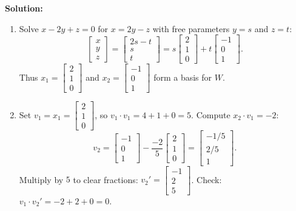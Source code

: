 \documentclass[11pt, letterpaper]{article}
\theoremstyle{definition}
\theoremstyle{remark}
\begin{document}
\textbf{Solution:}
\begin{enumerate}[label=\textbf{Step \arabic*:}]
    \item Solve $x - 2y + z = 0$ for $x = 2y - z$ with free parameters $y = s$ and $z = t$:
    \[
        \begin{bmatrix} x \\ y \\ z \end{bmatrix} = \begin{bmatrix} 2s - t \\ s \\ t \end{bmatrix} = s\begin{bmatrix} 2 \\ 1 \\ 0 \end{bmatrix} + t\begin{bmatrix} -1 \\ 0 \\ 1 \end{bmatrix}.
    \]
    Thus $x_1 = \begin{bmatrix} 2 \\ 1 \\ 0 \end{bmatrix}$ and $x_2 = \begin{bmatrix} -1 \\ 0 \\ 1 \end{bmatrix}$ form a basis for $W$.
    \item Set $v_1 = x_1 = \begin{bmatrix} 2 \\ 1 \\ 0 \end{bmatrix}$, so $v_1 \cdot v_1 = 4 + 1 + 0 = 5$. Compute $x_2 \cdot v_1 = -2$:
    \[
        v_2 = \begin{bmatrix} -1 \\ 0 \\ 1 \end{bmatrix} - \frac{-2}{5}\begin{bmatrix} 2 \\ 1 \\ 0 \end{bmatrix} = \begin{bmatrix} -1/5 \\ 2/5 \\ 1 \end{bmatrix}.
    \]
    Multiply by $5$ to clear fractions: $v_2' = \begin{bmatrix} -1 \\ 2 \\ 5 \end{bmatrix}$. Check: $v_1 \cdot v_2' = -2 + 2 + 0 = 0$.

\end{enumerate}
\end{document}
